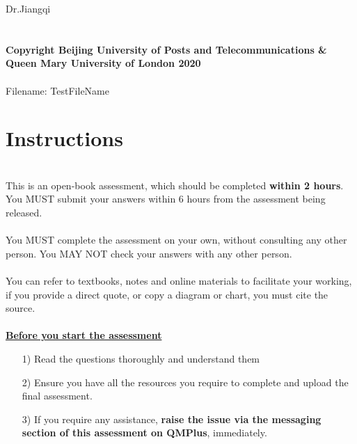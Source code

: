 \documentclass[11pt]{article}
\begin{document}
	\hspace{2em}Dr.Jiangqi
	~\\~\\~\\
	\textbf{\footnotesize Copyright  Beijing University of Posts and Telecommunications \&  Queen Mary University of London 2020}\\
	~\\
	Filename: TestFileName
	
	
	\newpage
	\thispagestyle{empty}
	\part*{{\Large Instructions}}
	~\\
	This is an open-book assessment, which should be completed \textbf{within 2 hours}. You MUST submit your answers within 6 hours from the assessment being released.\\
	~\\
	
	You MUST complete the assessment on your own, without consulting any other person. You MAY NOT check your answers with any other person.\\
	~\\
	
	You can refer to textbooks, notes and online materials to facilitate your working, if you provide a direct quote, or copy a diagram or chart, you must cite the source.\\
	~\\
	
	\textbf{\underline{Before you start the assessment}}
	\begin{enumerate}
		\item[1) ] Read the questions thoroughly and understand them
		\item[2) ] Ensure you have all the resources you require to complete and upload the final assessment.
		\item[3) ] If you require any assistance, \textbf{raise the issue via the messaging section of this assessment on QMPlus}, immediately.
	\end{enumerate}
	~\\
	
\end{document}

